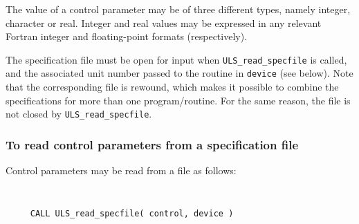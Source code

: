 \documentclass{galahad}
\newcommand{\packagename}{ULS}
\begin{document}
The value of a control parameter may be of three different types, namely
integer, character or real.
Integer and real values may be expressed in any relevant Fortran integer and
floating-point formats (respectively). 

The specification file must be open for 
input when {\tt \packagename\_read\_specfile}
is called, and the associated unit number 
passed to the routine in {\tt device} (see below). 
Note that the corresponding 
file is rewound, which makes it possible to combine the specifications 
for more than one program/routine.  For the same reason, the file is not
closed by {\tt \packagename\_read\_specfile}.

\subsubsection{To read control parameters from a specification file}
\label{readspec}

Control parameters may be read from a file as follows:
\hskip0.5in 

\def\baselinestretch{0.8}
{\tt 
\begin{verbatim}
     CALL ULS_read_specfile( control, device )
\end{verbatim}
}
\def\baselinestretch{1.0}
\end{document}
